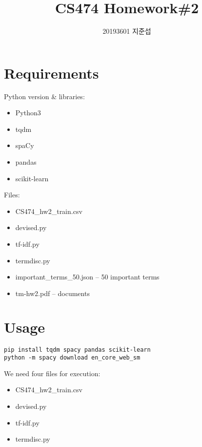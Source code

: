 \documentclass{article}
\author{20193601 지준섭}
\title{CS474 Homework\#2}
\begin{document}
\maketitle

\section{Requirements}
Python version \& libraries:
\begin{itemize}
  \item Python3
  \item tqdm
  \item spaCy
  \item pandas
  \item scikit-learn
\end{itemize}

Files:
\begin{itemize}
  \item CS474\_hw2\_train.csv
  \item devised.py
  \item tf-idf.py
  \item termdisc.py
  \item important\_terms\_50.json -- 50 important terms
  \item tm-hw2.pdf -- documents
\end{itemize}

\section{Usage}
\begin{verbatim}
pip install tqdm spacy pandas scikit-learn
python -m spacy download en_core_web_sm
\end{verbatim}

We need four files for execution:

\begin{itemize}
  \item CS474\_hw2\_train.csv
  \item devised.py
  \item tf-idf.py
  \item termdisc.py
\end{itemize}
\end{document}

